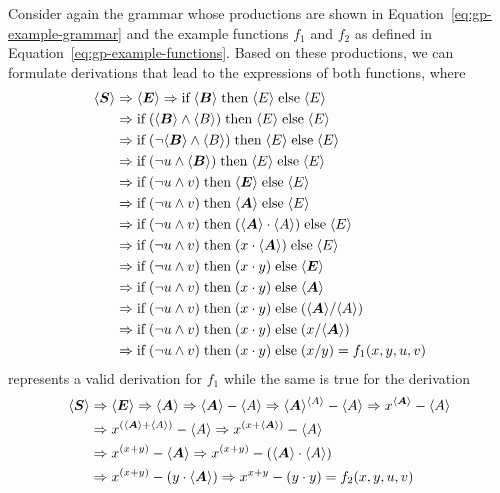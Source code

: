 Consider again the grammar whose productions are shown in Equation~\eqref{eq:gp-example-grammar} and the example functions $f_1$ and $f_2$ as defined in Equation~\eqref{eq:gp-example-functions}.
Based on these productions, we can formulate derivations that lead to the expressions of both functions, where
\begin{equation}
	\begin{aligned}
		\langle \bm{S} \rangle & \Rightarrow \langle \bm{E} \rangle \Rightarrow \text{if} \; \langle \bm{B} \rangle \; \text{then} \; \langle E \rangle \; \text{else} \; \langle E \rangle 
		\\ & \Rightarrow \text{if} \; (\langle \bm{B} \rangle \wedge \langle B \rangle) \; \text{then} \; \langle E \rangle \; \text{else} \; \langle E \rangle
		\\ & \Rightarrow \text{if} \; (\neg \langle \bm{B} \rangle \wedge \langle B \rangle) \; \text{then} \; \langle E \rangle \; \text{else} \; \langle E \rangle 
		\\ & \Rightarrow \text{if} \; (\neg u \wedge \langle \bm{B} \rangle) \; \text{then} \; \langle E \rangle \; \text{else} \; \langle E \rangle 
		\\ & \Rightarrow \text{if} \; (\neg u \wedge v) \; \text{then} \; \langle \bm{E} \rangle \; \text{else} \; \langle E \rangle 	
		\\ & \Rightarrow \text{if} \; (\neg u \wedge v) \; \text{then} \; \langle \bm{A} \rangle \; \text{else} \; \langle E \rangle 	
		\\ & \Rightarrow \text{if} \; (\neg u \wedge v) \; \text{then} \; (\langle \bm{A} \rangle \cdot \langle A \rangle) \; \text{else} \; \langle E \rangle 	 
		\\ & \Rightarrow \text{if} \; (\neg u \wedge v) \; \text{then} \; (x \cdot \langle \bm{A} \rangle) \; \text{else} \; \langle E \rangle 
		\\ & \Rightarrow \text{if} \; (\neg u \wedge v) \; \text{then} \; (x \cdot y) \; \text{else} \; \langle \bm{E} \rangle
		\\ & \Rightarrow \text{if} \; (\neg u \wedge v) \; \text{then} \; (x \cdot y) \; \text{else} \; \langle \bm{A} \rangle
		\\ & \Rightarrow \text{if} \; (\neg u \wedge v) \; \text{then} \; (x \cdot y) \; \text{else} \; (\langle \bm{A} \rangle / \langle A \rangle)
		\\ & \Rightarrow \text{if} \; (\neg u \wedge v) \; \text{then} \; (x \cdot y) \; \text{else} \; (x / \langle \bm{A} \rangle)
		\\ & \Rightarrow \text{if} \; (\neg u \wedge v) \; \text{then} \; (x \cdot y) \; \text{else} \; (x / y) = f_1(x,y,u,v)
	\end{aligned}
\label{eq:gp-derivation-f1}
\end{equation}
represents a valid derivation for $f_1$ while the same is true for the derivation
\begin{equation}
\begin{aligned}
	\langle \bm{S} \rangle & \Rightarrow \langle \bm{E} \rangle \Rightarrow \langle \bm{A} \rangle \Rightarrow \langle \bm{A} \rangle - \langle A \rangle \Rightarrow \langle \bm{A} \rangle^{\langle A \rangle} - \langle A \rangle
	\Rightarrow x^{\langle \bm{A} \rangle} - \langle A \rangle 	
	\\ & \Rightarrow x^{(\langle \bm{A} \rangle + \langle A \rangle)} - \langle A \rangle \Rightarrow x^{(x + \langle \bm{A} \rangle)} - \langle A \rangle 
	\\ & \Rightarrow x^{(x + y)} - \langle \bm{A} \rangle \Rightarrow x^{(x + y)} - (\langle \bm{A} \rangle \cdot \langle A \rangle) 
	\\ & \Rightarrow x^{(x + y)} - (y \cdot \langle \bm{A} \rangle) \Rightarrow x^{x + y} - (y \cdot y) = f_2(x,y,u,v)
\end{aligned}
\end{equation}
